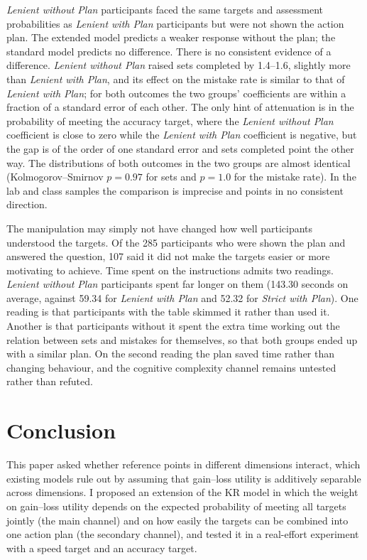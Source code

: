 \documentclass[12pt, letterpaper]{article}
\newcommand{\LPName}{Lenient with Plan}
\newcommand{\SPName}{Strict with Plan}
\newcommand{\LNName}{Lenient without Plan}
\newcommand{\LP}{\textit{\LPName}}
\newcommand{\SP}{\textit{\SPName}}
\newcommand{\LN}{\textit{\LNName}}
\begin{document}
\LN{} participants faced the same targets and assessment probabilities as \LP{} participants but were not shown the action plan. The extended model predicts a weaker response without the plan; the standard model predicts no difference. There is no consistent evidence of a difference. \LN{} raised sets completed by 1.4--1.6, slightly more than \LP{}, and its effect on the mistake rate is similar to that of \LP{}; for both outcomes the two groups' coefficients are within a fraction of a standard error of each other. The only hint of attenuation is in the probability of meeting the accuracy target, where the \LN{} coefficient is close to zero while the \LP{} coefficient is negative, but the gap is of the order of one standard error and sets completed point the other way. The distributions of both outcomes in the two groups are almost identical (Kolmogorov--Smirnov $p = 0.97$ for sets and $p = 1.0$ for the mistake rate). In the lab and class samples the comparison is imprecise and points in no consistent direction.

The manipulation may simply not have changed how well participants understood the targets. Of the 285 participants who were shown the plan and answered the question, 107 said it did not make the targets easier or more motivating to achieve. Time spent on the instructions admits two readings. \LN{} participants spent far longer on them (143.30 seconds on average, against 59.34 for \LP{} and 52.32 for \SP{}). One reading is that participants with the table skimmed it rather than used it. Another is that participants without it spent the extra time working out the relation between sets and mistakes for themselves, so that both groups ended up with a similar plan. On the second reading the plan saved time rather than changing behaviour, and the cognitive complexity channel remains untested rather than refuted.

\section{Conclusion}

This paper asked whether reference points in different dimensions interact, which existing models rule out by assuming that gain--loss utility is additively separable across dimensions. I proposed an extension of the KR model in which the weight on gain--loss utility depends on the expected probability of meeting all targets jointly (the main channel) and on how easily the targets can be combined into one action plan (the secondary channel), and tested it in a real-effort experiment with a speed target and an accuracy target.
\end{document}
